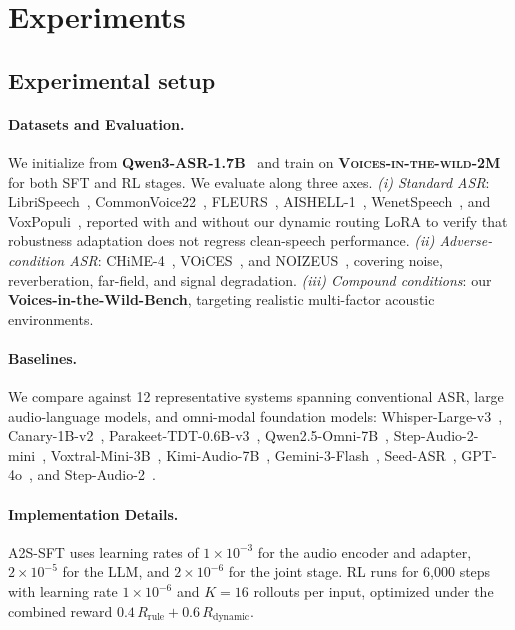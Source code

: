 \documentclass{llmxive}
\begin{document}
\vspace*{-6mm}
\section{\vspace{-2mm}Experiments}
\vspace{-1mm}
\subsection{Experimental setup}
\vspace{-2mm}

\paragraph{Datasets and Evaluation.}
We initialize from \textbf{Qwen3-ASR-1.7B}~\citep{qwen3-asr} and train on \textbf{ \textsc{Voices-in-the-wild-2M} } for both SFT and RL 
stages. We evaluate along three axes. \textit{(i) Standard ASR}: 
LibriSpeech~\citep{librispeech}, CommonVoice22~\citep{commonvoice}, FLEURS~\citep{fleurs}, 
AISHELL-1~\citep{aishell}, WenetSpeech~\citep{wenetspeech}, and VoxPopuli~\citep{voxpopuli}, 
reported with and without our dynamic routing LoRA to verify that 
robustness adaptation does not regress clean-speech performance. 
\textit{(ii) Adverse-condition ASR}: CHiME-4~\citep{CHIME4}, 
VOiCES~\citep{VOICES}, and NOIZEUS~\citep{Noizeus}, covering noise, reverberation, 
far-field, and signal degradation. \textit{(iii) Compound conditions}: 
our \textbf{Voices-in-the-Wild-Bench}, targeting realistic multi-factor 
acoustic environments.

\vspace{-2mm}

\paragraph{Baselines.}
We compare against 12 representative systems spanning conventional ASR, 
large audio-language models, and omni-modal foundation models: 
Whisper-Large-v3~\citep{whisper}, Canary-1B-v2~\citep{canary&parakeet}, 
Parakeet-TDT-0.6B-v3~\citep{canary&parakeet}, 
Qwen2.5-Omni-7B~\citep{qwen2.5omni}, Step-Audio-2-mini~\citep{stepaudio2}, Voxtral-Mini-3B~\citep{voxtral}, Kimi-Audio-7B~\citep{Kimi-Audio}, Gemini-3-Flash~\citep{}, Seed-ASR~\citep{seedasr}, 
GPT-4o~\citep{gpt-4o}, and Step-Audio-2~\citep{stepaudio2}.

\paragraph{Implementation Details.}
A2S-SFT uses learning rates of $1{\times}10^{-3}$ for the audio encoder 
and adapter, $2{\times}10^{-5}$ for the LLM, and $2{\times}10^{-6}$ for 
the joint stage. RL runs for 6{,}000 steps with learning rate 
$1{\times}10^{-6}$ and $K{=}16$ rollouts per input, optimized under the 
combined reward  $0.4\,R_\text{rule} + 0.6\,R_\text{dynamic}$. 
\end{document}

